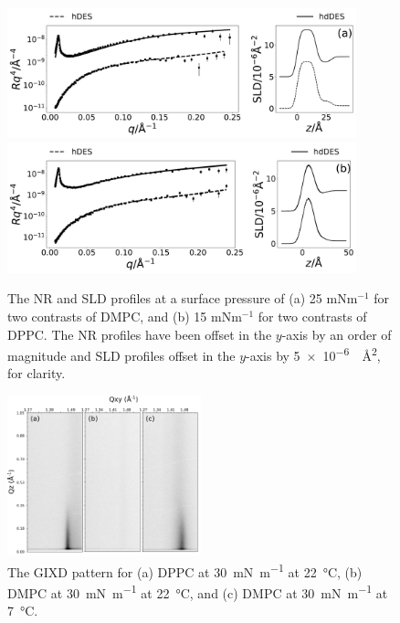 \documentclass[11pt,a4paper]{paper}
\begin{document}
\begin{figure}[H]
	\centering
	\includegraphics[width=0.9\textwidth]{figures/dmpc_25n_ref_sld}
	\includegraphics[width=0.9\textwidth]{figures/dppc_15n_ref_sld}
	\caption{The NR and SLD profiles at a surface pressure of (a) 25 mNm$^{-1}$ for two contrasts of DMPC, and (b) 15 mNm$^{-1}$ for two contrasts of DPPC. The NR profiles have been offset in the $y$-axis by an order of magnitude and SLD profiles offset in the $y$-axis by \SI{5e-6}{\per\square\angstrom}, for clarity.}
	\label{fig:neutron}
\end{figure}

\begin{figure}[H]
	\centering
	\includegraphics[width=0.50\textwidth]{figures/gixd}
	\caption{The GIXD pattern for (a) DPPC at \SI{30}{\milli\newton\per\meter} at \SI{22}{\celsius}, (b) DMPC at \SI{30}{\milli\newton\per\meter} at \SI{22}{\celsius}, and (c) DMPC at \SI{30}{\milli\newton\per\meter} at \SI{7}{\celsius}.}
	\label{fig:gixd}
\end{figure}
\end{document}
